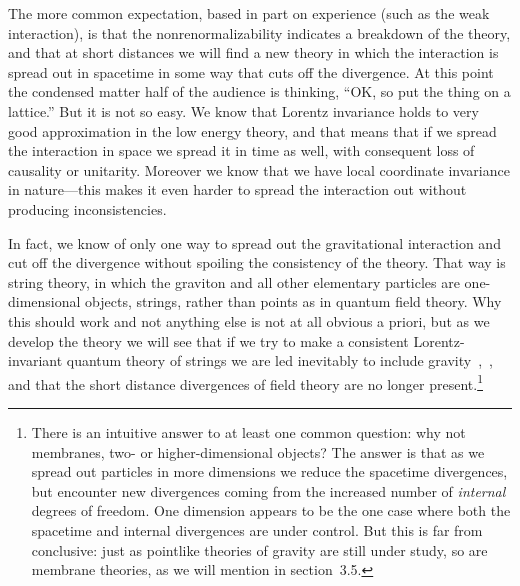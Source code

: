 The more common expectation, based in part on experience (such as
the weak interaction), is that the nonrenormalizability indicates a
breakdown of the theory, and that at short distances we will find a
new theory in which the interaction is spread out in
spacetime in some way that cuts off the divergence.  At this point
the condensed matter half of the audience is thinking, ``OK,
so put the thing on a lattice.''  But it is not so easy.  We know
that Lorentz invariance holds to very good approximation in the low
energy theory, and that means that if we spread the interaction in
space we spread it in time as well, with consequent loss of
causality or unitarity.  Moreover we know that we have local
coordinate invariance in nature---this makes it even harder to
spread the interaction out without producing inconsistencies.

In fact, we know of only one way to spread out the gravitational
interaction and cut off the divergence without spoiling the
consistency of the theory.  That way is string theory, in which the
graviton and all other elementary particles are one-dimensional
objects, strings, rather than points as in quantum field theory.
Why this should work and not anything else is not at all obvious
a priori, but as we develop the theory we will see that if we try
to make a consistent Lorentz-invariant quantum theory of strings
we are led inevitably to include gravity~\cite{Yon},~\cite{SS}, and
that the short distance divergences of field theory are no longer
present.\footnote
{There is an intuitive answer to at least one common question:
why not membranes, two- or higher-dimensional objects?
The answer is that as we spread out particles in more
dimensions we reduce the spacetime divergences, but encounter
new divergences coming from the increased number of {\it
internal} degrees of freedom.  One dimension appears to be the
one case where both the spacetime and internal divergences are
under control.  But this is far from conclusive: just as
pointlike theories of gravity are still under study, so are
membrane theories, as we will mention in section~3.5.}

